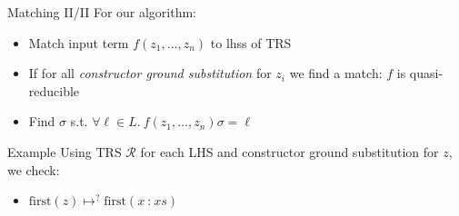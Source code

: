 \begin{frame}{Matching II/II}
For our algorithm:
\begin{itemize}
    \item Match input term $f(z_1, ..., z_n)$ to lhss of TRS
    \item If for all \textit{constructor ground substitution} for $z_i$ we find a match: $f$ is quasi-reducible
    \item Find $\sigma$ s.t. $\forall \ell \in L.\ f(z_1, ..., z_n)\sigma = \ell$
\end{itemize}

\begin{block}{Example}
Using TRS $\mathcal{R}$ for each LHS and constructor ground substitution for $z$, we check:
\begin{itemize}
    \item $\text{first}(z) \mapsto^? \text{first}(x\ \texttt{:}\ xs)$
\end{itemize}
\end{block}
\end{frame}